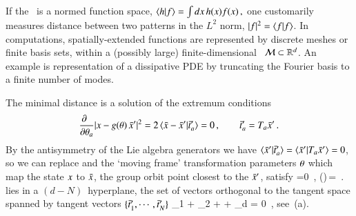 \documentclass[preprint,12pt]{elsarticle} %
\begin{document}
If the \statesp\ is a normed function space,
\( %
\braket{h}{f} = \int dx \, h(x) f(x)
\,,
\) %
one customarily measures distance between two patterns in the $L^2$ norm,
$|f|^2 = \braket{f}{f}$. In computations, spatially-extended functions are
represented by discrete meshes or finite basis sets, within a (possibly
large) finite-dimensional \statesp\  ${\cal M} \subset \mathbb{R}^d$. An example
is representation of a dissipative PDE by truncating the Fourier basis
 to a finite number of modes.

The minimal distance is a solution of the extremum conditions
\[ %
\frac{\partial ~~}{\partial \gSpace_a} |\ssp - \LieEl(\gSpace)\,\slicep|^2
   =
    \edit{
2\, \braket{\sspRed - \slicep}{\sliceTan{a}}
    }
   = 0
    \,,\qquad
	  \sliceTan{a} = \Lg_a \slicep
\,.
\] %
By the antisymmetry of the Lie algebra generators we have
$\braket{\slicep}{\sliceTan{a}} = \braket{\slicep}{\Lg_{a}\slicep}=0$, so
we can replace
    \edit{
$\sspRed - \slicep \to \sspRed$,
    }
and the `moving frame' transformation
parameters ${\bf \theta}$ which map the state $x$ to $\bar{x}$, the group
orbit point closest to the {\template} $\bar{x}'$, satisfy
\beq
{} =0
    \,,\qquad
\LieEl(\gSpace)\,\sspRed = \ssp
\,.
lies in a $(d\!-\!N)$\dmn\ hyperplane, the set of vectors
orthogonal to the {\template} tangent space spanned by tangent vectors
$\{\bar{t}{}'_{1},\cdots,\bar{t}{}'_{N}\}$
                    \toCB
\beq
\sspRed_1 + \sspRed_2
  + \cdots + \sspRed_d = 0
\,,
													\toCB
see \,(a).
\end{document}
